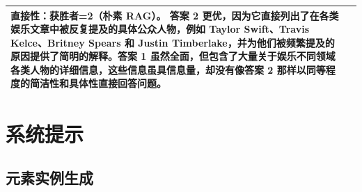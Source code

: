 \documentclass[11pt,UTF8,fontset=fandol]{ctexart}
\begin{document}
\begin{table}[H]
\begin{tabular}{@{}p{1.7cm}p{13cm}@{}}
\textbf{直接性：获胜者=2（朴素 RAG）。} 答案 2 更优，因为它直接列出了在各类娱乐文章中被反复提及的具体公众人物，例如 Taylor Swift、Travis Kelce、Britney Spears 和 Justin Timberlake，并为他们被频繁提及的原因提供了简明的解释。答案 1 虽然全面，但包含了大量关于娱乐不同领域各类人物的详细信息，这些信息虽具信息量，却没有像答案 2 那样以同等程度的简洁性和具体性直接回答问题。 \\
\bottomrule
\end{tabular}
\end{table}

\section{系统提示}

\subsection{元素实例生成}
\end{document}
